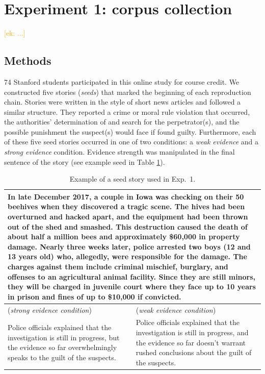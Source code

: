 \documentclass[10pt,letterpaper]{article}
\newcommand{\ek}[1]{\textcolor{Orange}{[ek: #1]}}
\begin{document}
\section{Experiment 1: corpus collection}
\ek{...}

\subsection{Methods}
74 Stanford students participated in this online study for course credit. 
We constructed five stories (\textit{seeds}) that marked the beginning of each reproduction chain.  Stories were written in the style of short news articles and followed a similar structure. They reported a crime or moral rule violation that occurred, the authorities' determination of and search for the perpetrator(s), and the possible punishment the suspect(s) would face if found guilty. Furthermore, each of these five seed stories occurred in one of two conditions: a \emph{weak evidence} and a \emph{strong evidence} condition. Evidence strength was manipulated in the final sentence of the story (see example seed in Table \ref{tab:examplestory}).

\begin{table}
\caption{Example of a seed story used in Exp.~1.}
\centering
\begin{tabular}{p{} p{}}
  \toprule
  \multicolumn{2}{p{0.925\textwidth}}{In late December 2017, a couple in Iowa was checking on their 50 beehives when they discovered a tragic scene. The hives had been overturned and hacked apart, and the equipment had been thrown out of the shed and smashed. This destruction caused the death of about half a million bees and approximately \$60,000 in property damage. Nearly three weeks later, police arrested two boys (12 and 13 years old) who, allegedly, were responsible for the damage. The charges against them include criminal mischief, burglary, and offenses to an agricultural animal facility. Since they are still minors, they will be charged in juvenile court where they face up to 10 years in prison and fines of up to \$10,000 if convicted.}\\ 
  \midrule
  (\emph{strong evidence condition}) & (\emph{weak evidence condition})  \\
  Police officials explained that the investigation is still in progress, but the evidence so far overwhelmingly speaks to the guilt of the suspects.  & Police officials explained that the investigation is still in progress, and the evidence so far doesn't warrant rushed conclusions about the guilt of the suspects. \\ 
  \bottomrule
\end{tabular}
\label{tab:examplestory}
\end{table}
\end{document}
